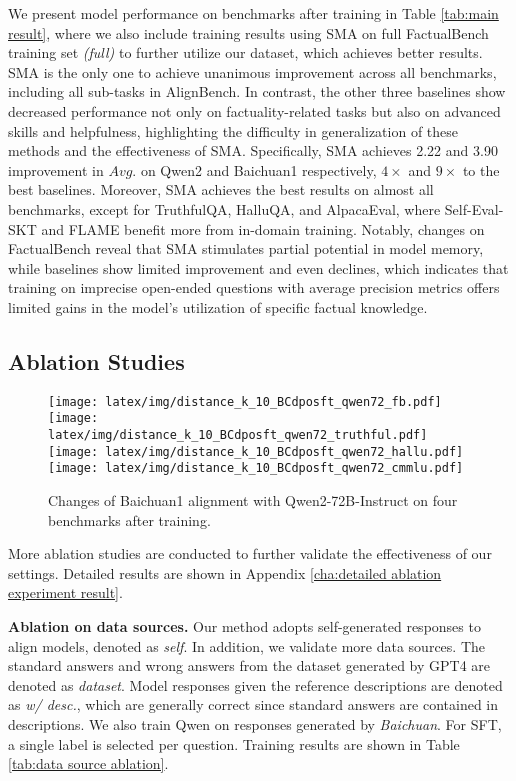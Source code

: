 We present model performance on benchmarks after training in Table \ref{tab:main result}, where we also include training results using SMA on full FactualBench training set \textit{(full)} to further utilize our dataset, which achieves better results. SMA is the only one to achieve unanimous improvement across all benchmarks, including all sub-tasks in AlignBench. In contrast, the other three baselines show decreased performance not only on factuality-related tasks but also on advanced skills and helpfulness, highlighting the difficulty in generalization of these methods and the effectiveness of SMA. Specifically, SMA achieves 2.22 and 3.90 improvement in $Avg.$ on Qwen2 and Baichuan1 respectively, $4 \times$ and $9 \times$ to the best baselines. Moreover, SMA achieves the best results on almost all benchmarks, except for TruthfulQA, HalluQA, and AlpacaEval, where Self-Eval-SKT and FLAME benefit more from in-domain training. Notably, changes on FactualBench reveal that SMA stimulates partial potential in model memory, while baselines show limited improvement and even declines, which indicates that training on imprecise open-ended questions with average precision metrics offers limited gains in the model's utilization of specific factual knowledge. 

\subsection{Ablation Studies}
\begin{figure*}
  \texttt{[image: latex/img/distance\_k\_10\_BCdposft\_qwen72\_fb.pdf]} \hfill
  \texttt{[image: latex/img/distance\_k\_10\_BCdposft\_qwen72\_truthful.pdf]} \hfill
  \texttt{[image: latex/img/distance\_k\_10\_BCdposft\_qwen72\_hallu.pdf]} \hfill
  \texttt{[image: latex/img/distance\_k\_10\_BCdposft\_qwen72\_cmmlu.pdf]}
  \caption {Changes of Baichuan1 alignment with Qwen2-72B-Instruct on four benchmarks after training.}
  \label{fig:alignment}
\end{figure*}

More ablation studies are conducted to further validate the effectiveness of our settings. Detailed results are shown in Appendix \ref{cha:detailed ablation experiment result}.

\textbf{Ablation on data sources.} Our method adopts self-generated responses to align models, denoted as \textit{self}. In addition, we validate more data sources. The standard answers and wrong answers from the dataset generated by GPT4 are denoted as \textit{dataset}. Model responses given the reference descriptions are denoted as \textit{w/ desc.}, which are generally correct since standard answers are contained in descriptions. We also train Qwen on responses generated by \textit{Baichuan}. For SFT, a single label is selected per question. Training results are shown in Table \ref{tab:data source ablation}.

